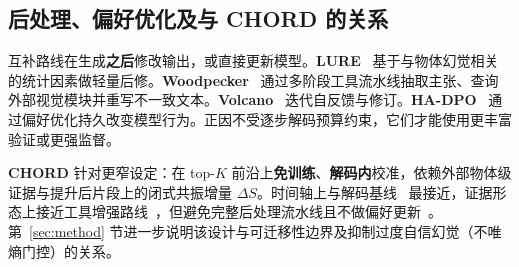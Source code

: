 \subsection{后处理、偏好优化及与 CHORD 的关系}

互补路线在生成\textbf{之后}修改输出，或直接更新模型。\textbf{LURE}~\cite{zhou2024lure} 基于与物体幻觉相关的统计因素做轻量后修。\textbf{Woodpecker}~\cite{yin2024woodpecker} 通过多阶段工具流水线抽取主张、查询外部视觉模块并重写不一致文本。\textbf{Volcano}~\cite{lee2024volcano} 迭代自反馈与修订。\textbf{HA-DPO}~\cite{zhao2023hadpo} 通过偏好优化持久改变模型行为。正因不受逐步解码预算约束，它们才能使用更丰富验证或更强监督。

\textbf{CHORD} 针对更窄设定：在 top-$K$ 前沿上\textbf{免训练}、\textbf{解码内}校准，依赖外部物体级证据与提升后片段上的闭式共振增量 $\Delta S$。时间轴上与解码基线~\cite{leng2024vcd,huang2024opera,chuang2024dola,wang2024deco} 最接近，证据形态上接近工具增强路线~\cite{yin2024woodpecker}，但避免完整后处理流水线且不做偏好更新~\cite{zhao2023hadpo}。第~\ref{sec:method} 节进一步说明该设计与可迁移性边界及抑制过度自信幻觉（不唯熵门控）的关系。
